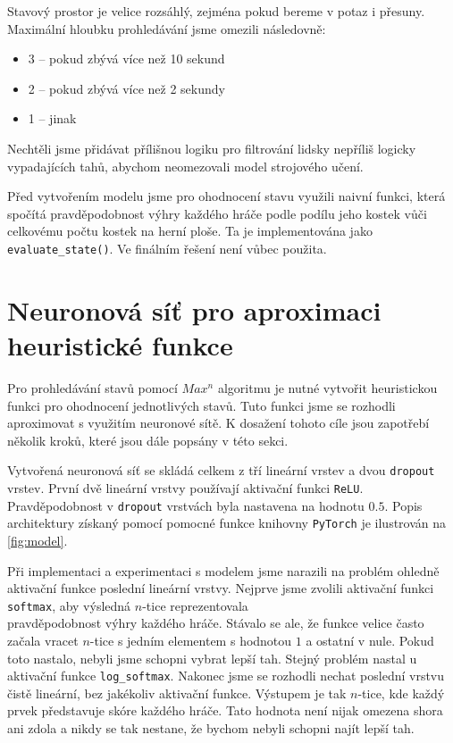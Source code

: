 \documentclass[a4paper,11pt]{article}
\begin{document}
		Stavový prostor je velice rozsáhlý, zejména pokud bereme v potaz i přesuny. Maximální hloubku prohledávání jsme omezili následovně:
		\begin{itemize}
			\item 3 -- pokud zbývá více než 10 sekund
			\item 2 -- pokud zbývá více než 2 sekundy
			\item 1 -- jinak
		\end{itemize}
	
		Nechtěli jsme přidávat přílišnou logiku pro filtrování lidsky nepříliš logicky vypadajících tahů, abychom neomezovali model strojového učení.
		
		Před vytvořením modelu jsme pro ohodnocení stavu využili naivní funkci, která spočítá pravděpodobnost výhry každého hráče podle podílu jeho kostek vůči celkovému počtu kostek na herní ploše. Ta je implementována jako \texttt{evaluate\_state()}. Ve finálním řešení není vůbec použita.
	
	\section{Neuronová síť pro aproximaci heuristické funkce}
	\label{section:nn}
		Pro prohledávání stavů pomocí \texttt{$Max^n$} algoritmu je nutné vytvořit heuristickou funkci pro ohodnocení jednotlivých stavů. Tuto funkci jsme se rozhodli aproximovat s využitím neuronové sítě. K dosažení tohoto cíle jsou zapotřebí několik kroků, které jsou dále popsány v této sekci.
		
		Vytvořená neuronová síť se skládá celkem z tří lineární vrstev a dvou \texttt{dropout} vrstev. První dvě lineární vrstvy používají aktivační funkci \texttt{ReLU}. Pravděpodobnost v \texttt{dropout} vrstvách byla nastavena na hodnotu $0.5$. Popis architektury získaný pomocí pomocné funkce knihovny \texttt{PyTorch} je ilustrován na \ref{fig:model}.
		
		Při implementaci a experimentaci s modelem jsme narazili na problém ohledně aktivační funkce poslední lineární vrstvy. Nejprve jsme zvolili aktivační funkci \texttt{softmax}, aby výsledná $n$-tice reprezentovala\\pravděpodobnost výhry každého hráče. Stávalo se ale, že funkce velice často začala vracet $n$-tice s jedním elementem s hodnotou $1$ a ostatní v nule. Pokud toto nastalo, nebyli jsme schopni vybrat lepší tah. Stejný problém nastal u aktivační funkce \texttt{log\_softmax}. Nakonec jsme se rozhodli nechat poslední vrstvu čistě lineární, bez jakékoliv aktivační funkce. Výstupem je tak $n$-tice, kde každý prvek představuje skóre každého hráče. Tato hodnota není nijak omezena shora ani zdola a nikdy se tak nestane, že bychom nebyli schopni najít lepší tah.
		
\end{document}
